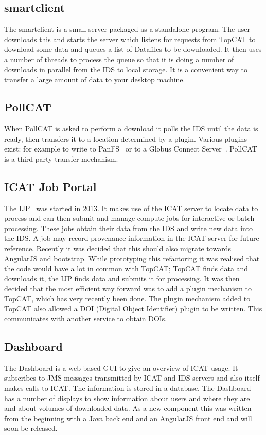 \documentclass[a4paper]{jpconf}
\begin{document}
\subsection{smartclient}
The smartclient is a small server packaged as a standalone
program. The user downloads this and starts the server which listens
for requests from TopCAT to download some data and queues a list of
Datafiles to be downloaded. It then uses a number of threads to
process the queue so that it is doing a number of downloads in
parallel from the IDS to local storage. It is a convenient way to
transfer a large amount of data to your desktop machine.

\subsection{PollCAT}
When PollCAT is asked to perform a download it polls the IDS until
the data is ready, then transfers it to a location determined by a
plugin. Various plugins exist: for example to write to
PanFS~\cite{ref:panfs} or to a Globus Connect
Server~\cite{ref:globus_connect_server}. PollCAT is a third party
transfer mechanism.

\subsection{ICAT Job Portal}
The IJP~\cite{ref:ijp} was started in 2013. It makes use of the ICAT
server to locate data to process and can then submit and manage
compute jobs for interactive or batch processing. These jobs obtain
their data from the IDS and write new data into the IDS. A job may
record provenance information in the ICAT server for future
reference. Recently it was decided that this should also migrate
towards AngularJS and bootstrap. While prototyping this refactoring it
was realised that the code would have a lot in common with TopCAT;
TopCAT finds data and downloads it, the IJP finds data and submits it
for processing. It was then decided that the most efficient way
forward was to add a plugin mechanism to TopCAT, which has very
recently been done. The plugin mechanism added to TopCAT also allowed
a DOI (Digital Object Identifier) plugin to be written. This
communicates with another service to obtain DOIs.

\subsection{Dashboard}
The Dashboard is a web based GUI to give an overview of ICAT usage. It
subscribes to JMS messages transmitted by ICAT and IDS servers and
also itself makes calls to ICAT. The information is stored in a
database. The Dashboard has a number of displays to show information
about users and where they are and about volumes of downloaded
data. As a new component this was written from the beginning with a
Java back end and an AngularJS front end and will soon be released.
\end{document}
